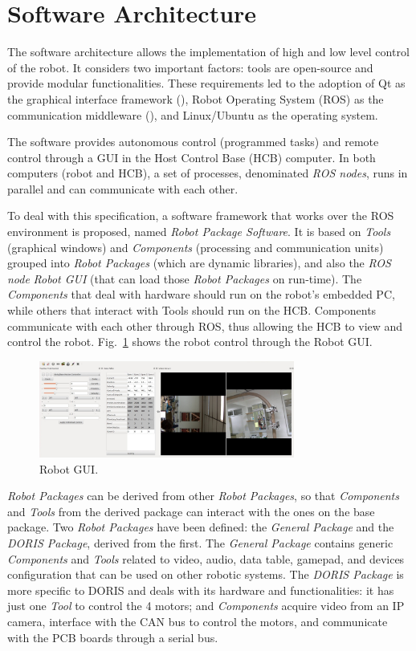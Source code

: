 \documentclass{ifacconf}
\begin{document}
\section{Software Architecture}\label{sec:software}
The software architecture allows the implementation of high and low level
control of the robot. It considers two important factors: tools are open-source
and provide modular functionalities. These requirements led to the adoption of
Qt as the graphical interface framework (\cite{qt}), Robot Operating System
(ROS) as the communication middleware (\cite{ros}), and Linux/Ubuntu as the
operating system.

The software provides autonomous control (programmed tasks) and remote control
through a GUI in the Host Control Base (HCB) computer. In both computers (robot
and HCB), a set of processes, denominated \emph{ROS nodes}, runs in parallel and
can communicate with each other.

To deal with this specification, a software framework that works over the ROS
environment is proposed, named \emph{Robot Package Software}. It is based on
\emph{Tools} (graphical windows) and \emph{Components} (processing and
communication units) grouped into \emph{Robot Packages} (which are dynamic
libraries), and also the \emph{ROS node} \emph{Robot GUI} (that can load those
\emph{Robot Packages} on run-time). The \emph{Components} that deal with
hardware should run on the robot’s embedded PC, while others that interact with
Tools should run on the HCB. Components communicate with each other through
ROS, thus allowing the HCB to view and control the robot.
Fig.~\ref{fig:robotgui} shows the robot control through the Robot GUI.

\begin{figure} 
\centering
\includegraphics[width=8.4cm]{figs/robotgui2.jpg}
\caption{Robot GUI.}
\label{fig:robotgui}
\end{figure}

\emph{Robot Packages} can be derived from other \emph{Robot Packages}, so that
\emph{Components} and \emph{Tools} from the derived package can interact with
the ones on the base package. Two \emph{Robot Packages} have been defined: the
\emph{General Package} and the \emph{DORIS Package}, derived from the first. The
\emph{General Package} contains generic \emph{Components} and \emph{Tools}
related to video, audio, data table, gamepad, and devices configuration that can
be used on other robotic systems. The \emph{DORIS Package} is more specific to
DORIS and deals with its hardware and functionalities: it has just one
\emph{Tool} to control the 4 motors; and \emph{Components} acquire video from
an IP camera, interface with the CAN bus to control the motors, and communicate
with the PCB boards through a serial bus.
\end{document}
